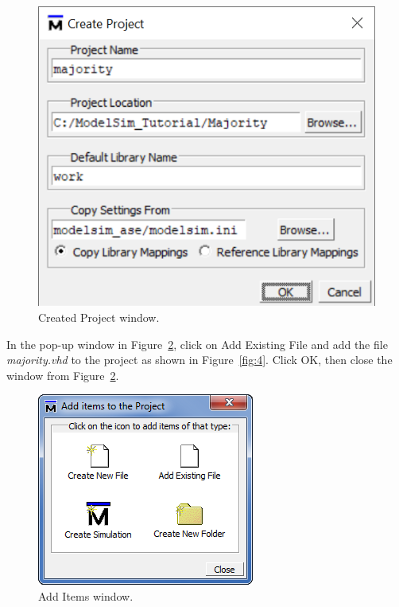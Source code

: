 \documentclass[11pt, twoside, pdftex]{article}
\begin{document}
\begin{figure}[H]
   \begin{center}
      \includegraphics[scale=1.0]{figures/figure2.png}
   \caption{Created Project window.} 
	 \label{fig:2}
	 \end{center}
\end{figure}
\newpage
In the pop-up window in Figure~\ref{fig:3}, click on {\sf Add Existing File} and add the 
file {\it majority.vhd} to the project as shown in Figure~\ref{fig:4}. Click OK, then close the 
window from Figure~\ref{fig:3}.

\begin{figure}[H]
   \begin{center}
      \includegraphics[scale=0.85]{figures/figure3.png}
   \caption{Add Items window.} 
	 \label{fig:3}
	 \end{center}
\end{figure}
\end{document}
